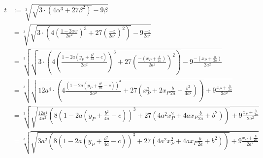 \begin{align}
    t &:= \sqrt[3]{\sqrt{3 \cdot (4 \alpha^3 + 27 \beta^2)} -9\beta}\\
    &= \sqrt[3]{\sqrt{3 \cdot \left (4 \left (\frac{1- 2 aw}{2 a^2} \right )^3 + 27 \left (\frac{-z}{2 a^2} \right )^2 \right )} -9 \frac{-z}{2 a^2}}\\
    &= \sqrt[3]{\sqrt{3 \cdot \left (4 \left (\frac{1- 2 a (y_P+\frac{b^2}{4a}-c)}{2 a^2} \right )^3 + 27 \left (\frac{-(x_P+\frac{b}{2a})}{2 a^2} \right )^2 \right )}
    -9 \frac{-(x_P+\frac{b}{2a})}{2 a^2}}\\
    &= \sqrt[3]{\sqrt{12a^4 \cdot \left (4 \frac{\left ( 1- 2 a (y_P+\frac{b^2}{4a}-c) \right )^3}{2 a^2}  + 27 \left (x_P^2+2 x_P \frac{b}{2a} + \frac{b^2}{4a^2} \right )\right )}
    + 9 \frac{x_P+\frac{b}{2a}}{2 a^2}}\\
    &= \sqrt[3]{\sqrt{\frac{12a^4}{4a^2} \left (8 \left ( 1- 2 a (y_P+\frac{b^2}{4a}-c) \right )^3  + 27 (4 a^2 x_P^2+4a x_P \frac{b}{2a} + b^2 )\right )}
    + 9 \frac{x_P+\frac{b}{2a}}{2 a^2}}\\
    &= \sqrt[3]{\sqrt{3a^2 \left (8 \left ( 1- 2 a (y_P+\frac{b^2}{4a}-c) \right )^3  + 27 (4 a^2 x_P^2+4a x_P \frac{b}{2a} + b^2 )\right )}
    + 9 \frac{x_P+\frac{b}{2a}}{2 a^2}}
\end{align}

